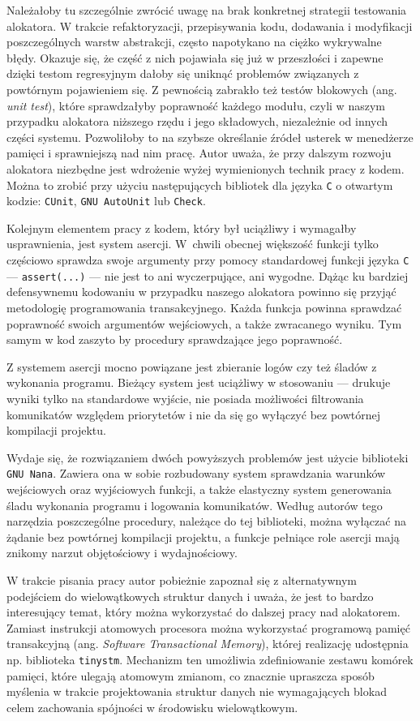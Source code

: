 \documentclass[12pt,a4paper,titlepage,twoside]{mwart}
\begin{document}
Należałoby tu szczególnie zwrócić uwagę na brak konkretnej strategii testowania
alokatora.  W trakcie refaktoryzacji, przepisywania kodu, dodawania i
modyfikacji poszczególnych warstw abstrakcji, często napotykano na ciężko
wykrywalne błędy. Okazuje się, że część z nich pojawiała się już w przeszłości
i zapewne dzięki testom regresyjnym dałoby się uniknąć problemów związanych z
powtórnym pojawieniem się. Z pewnością zabrakło też testów blokowych (ang.
\textit{unit test}), które sprawdzałyby poprawność każdego modułu, czyli w
naszym przypadku alokatora niższego rzędu i jego składowych, niezależnie od
innych części systemu. Pozwoliłoby to na szybsze określanie źródeł usterek w
menedżerze pamięci i sprawniejszą nad nim pracę. Autor uważa, że przy dalszym
rozwoju alokatora niezbędne jest wdrożenie wyżej wymienionych technik pracy z
kodem.  Można to zrobić przy użyciu następujących bibliotek dla języka \verb+C+
o otwartym kodzie: \texttt{CUnit}, \texttt{GNU AutoUnit} lub \texttt{Check}.

Kolejnym elementem pracy z kodem, który był uciążliwy i wymagałby usprawnienia,
jest system asercji. W~chwili obecnej większość funkcji tylko częściowo
sprawdza swoje argumenty przy pomocy standardowej funkcji języka \verb+C+ ---
\texttt{assert(...)} --- nie jest to ani wyczerpujące, ani wygodne. Dążąc ku
bardziej defensywnemu kodowaniu w przypadku naszego alokatora powinno się
przyjąć metodologię programowania transakcyjnego. Każda funkcja powinna
sprawdzać poprawność swoich argumentów wejściowych, a także zwracanego wyniku.
Tym samym w kod zaszyto by procedury sprawdzające jego poprawność.

Z systemem asercji mocno powiązane jest zbieranie logów czy też śladów z
wykonania programu. Bieżący system jest uciążliwy w stosowaniu --- drukuje
wyniki tylko na standardowe wyjście, nie posiada możliwości filtrowania
komunikatów względem priorytetów i nie da się go wyłączyć bez powtórnej
kompilacji projektu.

Wydaje się, że rozwiązaniem dwóch powyższych problemów jest użycie biblioteki
\texttt{GNU Nana}. Zawiera ona w sobie rozbudowany system sprawdzania warunków
wejściowych oraz wyjściowych funkcji, a także elastyczny system generowania
śladu wykonania programu i logowania komunikatów. Według autorów tego narzędzia
poszczególne procedury, należące do tej biblioteki, można wyłączać na żądanie
bez powtórnej kompilacji projektu, a funkcje pełniące role asercji mają znikomy
narzut objętościowy i wydajnościowy.

W trakcie pisania pracy autor pobieżnie zapoznał się z alternatywnym podejściem
do wielowątkowych struktur danych i uważa, że jest to bardzo interesujący
temat, który można wykorzystać do dalszej pracy nad alokatorem. Zamiast
instrukcji atomowych procesora można wykorzystać programową pamięć transakcyjną
(ang. \textit{Software Transactional Memory}), której realizację udostępnia np.
biblioteka \texttt{tinystm}.  Mechanizm ten umożliwia zdefiniowanie zestawu
komórek pamięci, które ulegają atomowym zmianom, co znacznie upraszcza sposób
myślenia w trakcie projektowania struktur danych nie wymagających blokad celem
zachowania spójności w środowisku wielowątkowym.
\end{document}
